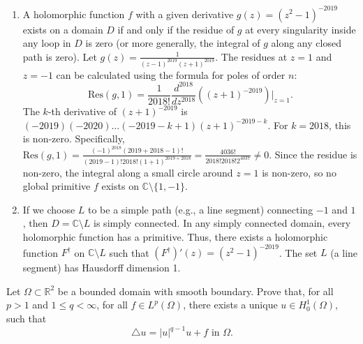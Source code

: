 \begin{solution}
\begin{enumerate}
\item A holomorphic function $f$ with a given derivative $g(z) = (z^2-1)^{-2019}$ exists on a domain $D$ if and only if the residue of $g$ at every singularity inside any loop in $D$ is zero (or more generally, the integral of $g$ along any closed path is zero).
Let $g(z) = \frac{1}{(z-1)^{2019}(z+1)^{2019}}$. The residues at $z=1$ and $z=-1$ can be calculated using the formula for poles of order $n$:
\[
\text{Res}(g, 1) = \frac{1}{2018!} \frac{d^{2018}}{dz^{2018}} \left( (z+1)^{-2019} \right) \Big|_{z=1}.
\]
The $k$-th derivative of $(z+1)^{-2019}$ is $(-2019)(-2020)\dots(-2019-k+1)(z+1)^{-2019-k}$.
For $k=2018$, this is non-zero. Specifically, $\text{Res}(g, 1) = \frac{(-1)^{2018} (2019+2018-1)!}{(2019-1)! 2018! (1+1)^{2019+2018}} = \frac{4036!}{2018! 2018! 2^{4037}} \neq 0$.
Since the residue is non-zero, the integral along a small circle around $z=1$ is non-zero, so no global primitive $f$ exists on $\mathbb{C} \setminus \{1, -1\}$.

\item If we choose $L$ to be a simple path (e.g., a line segment) connecting $-1$ and $1$, then $D = \mathbb{C} \setminus L$ is simply connected. In any simply connected domain, every holomorphic function has a primitive. Thus, there exists a holomorphic function $F^\dagger$ on $\mathbb{C} \setminus L$ such that $(F^\dagger)'(z) = (z^2-1)^{-2019}$. The set $L$ (a line segment) has Hausdorff dimension 1.
\end{enumerate}
\end{solution}

\begin{exercise}
\label{analysis:2019:5}
Let $\Omega\subset\mathbb{R}^2$ be a bounded domain with smooth boundary. Prove that, for all $p>1$ and $1\leq q < \infty$, for all $f\in L^p(\Omega)$, there exists a unique $u\in H_0^1(\Omega)$, such that
\[
\triangle u = |u|^{q-1}u + f \text{ in } \Omega.
\]
\end{exercise}

